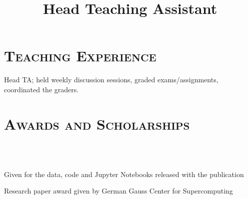 \begin{resume}
	\section{\textsc{Teaching Experience}}

	\title{Head Teaching Assistant}
	\begin{position}
		Head TA; held weekly discussion sessions, graded exams/assignments, coordinated the
    graders.
	\end{position}


	\section{\textsc{Awards and Scholarships}}

	\begin{formatb}
		\\
		\body\\
	\end{formatb}

  \begin{position}
    Given for the data, code and Jupyter Notebooks released with the publication
  \end{position}

  \begin{position}
    Research paper award given by German Gauss Center for Supercomputing
  \end{position}




\end{resume}
